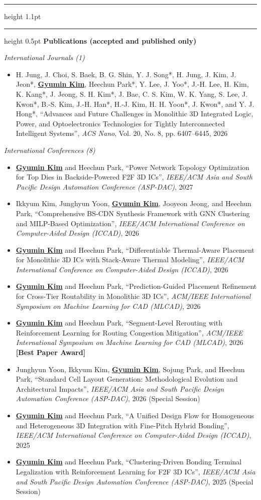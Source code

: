 \documentclass[11pt,a4paper]{article}
\newcommand{\doublerule}{%
  \par\vspace{8pt}%
  \hrule height 1.1pt\vspace{1.6pt}\hrule height 0.5pt%
  \vspace{3pt}}
\newcommand{\sect}[1]{\doublerule\textbf{#1}\par\vspace{1pt}}
\newcommand{\me}{\uline{\textbf{Gyumin Kim}}}
\begin{document}
\sect{Publications (accepted and published only)}
\textit{International Journals (1)}
\begin{itemize}
  \item H. Jung, J. Choi, S. Baek, B. G. Shin, Y. J. Song*, H. Jung, J. Kim, J. Jeon*, \me, Heechun Park*,
        Y. Lee, J. Yoo*, J.-H. Lee, H. Kim, K. Kang*, J. Jeong, S. H. Kim*, J. Bae, C. S. Kim, W. K. Yang,
        S. Lee, J. Kwon*, B.-S. Kim, J.-H. Han*, H.-J. Kim, H. H. Yoon*, J. Kwon*, and Y. J. Hong*,
        ``Advances and Future Challenges in Monolithic 3D Integrated Logic, Power, and Optoelectronics
        Technologies for Tightly Interconnected Intelligent Systems'', \textit{ACS Nano}, Vol. 20, No. 8,
        pp. 6407--6445, 2026
\end{itemize}

\vspace{4pt}
\textit{International Conferences (8)}
\begin{itemize}
  \item \me{} and Heechun Park, ``Power Network Topology Optimization for Top Dies in Backside-Powered F2F 3D ICs'',
        \textit{IEEE/ACM Asia and South Pacific Design Automation Conference (ASP-DAC)}, 2027
  \item Ikkyum Kim, Junghyun Yoon, \me, Jooyeon Jeong, and Heechun Park, ``Comprehensive BS-CDN Synthesis
        Framework with GNN Clustering and MILP-Based Optimization'', \textit{IEEE/ACM International Conference
        on Computer-Aided Design (ICCAD)}, 2026
  \item \me{} and Heechun Park, ``Differentiable Thermal-Aware Placement for Monolithic 3D ICs with Stack-Aware
        Thermal Modeling'', \textit{IEEE/ACM International Conference on Computer-Aided Design (ICCAD)}, 2026
  \item \me{} and Heechun Park, ``Prediction-Guided Placement Refinement for Cross-Tier Routability in Monolithic
        3D ICs'', \textit{ACM/IEEE International Symposium on Machine Learning for CAD (MLCAD)}, 2026
  \item \me{} and Heechun Park, ``Segment-Level Rerouting with Reinforcement Learning for Routing Congestion
        Mitigation'', \textit{ACM/IEEE International Symposium on Machine Learning for CAD (MLCAD)}, 2026
        \textbf{[Best Paper Award]}
  \item Junghyun Yoon, Ikkyum Kim, \me, Sojung Park, and Heechun Park, ``Standard Cell Layout Generation:
        Methodological Evolution and Architectural Impacts'', \textit{IEEE/ACM Asia and South Pacific Design
        Automation Conference (ASP-DAC)}, 2026 (Special Session)
  \item \me{} and Heechun Park, ``A Unified Design Flow for Homogeneous and Heterogeneous 3D Integration with
        Fine-Pitch Hybrid Bonding'', \textit{IEEE/ACM International Conference on Computer-Aided Design (ICCAD)}, 2025
  \item \me{} and Heechun Park, ``Clustering-Driven Bonding Terminal Legalization with Reinforcement Learning for
        F2F 3D ICs'', \textit{IEEE/ACM Asia and South Pacific Design Automation Conference (ASP-DAC)}, 2025 (Special Session)
\end{itemize}
\end{document}
